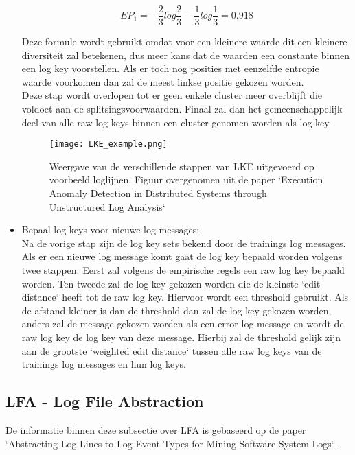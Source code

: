 \begin{itemize}
    \[EP_{1} = - \frac{2}{3}log\frac{2}{3} - \frac{1}{3}log\frac{1}{3} = 0.918\]
    
    Deze formule wordt gebruikt omdat voor een kleinere waarde dit een kleinere diversiteit zal betekenen, dus meer kans dat de waarden een constante binnen een log key voorstellen. Als er toch nog posities met eenzelfde entropie waarde voorkomen dan zal de meest linkse positie gekozen worden. \\
    
    Deze stap wordt overlopen tot er geen enkele cluster meer overblijft die voldoet aan de splitsingsvoorwaarden. Finaal zal dan het gemeenschappelijk deel van alle raw log keys binnen een cluster genomen worden als log key.\\
    
    \begin{center}
        \begin{figure}[!htp]
            \texttt{[image: LKE\_example.png]}
            \caption{Weergave van de verschillende stappen van LKE uitgevoerd op voorbeeld loglijnen. Figuur overgenomen uit de paper `Execution Anomaly Detection in Distributed Systems through Unstructured Log Analysis` \autocite{fu2009execution}}
            \label{pic:LKEstappen}
        \end{figure}
    \end{center}

    \item Bepaal log keys voor nieuwe log messages:\\
    Na de vorige stap zijn de log key sets bekend door de trainings log messages. Als er een nieuwe log message komt gaat de log key bepaald worden volgens twee stappen: Eerst zal volgens de empirische regels een raw log key bepaald worden. Ten tweede zal de log key gekozen worden die de kleinste `edit distance` heeft tot de raw log key. Hiervoor wordt een threshold gebruikt. Als de afstand kleiner is dan de threshold dan zal de log key gekozen worden, anders zal de message gekozen worden als een error log message en wordt de raw log key de log key van deze message. Hierbij zal de threshold gelijk zijn aan de grootste `weighted edit distance` tussen alle raw log keys van de trainings log messages en hun log keys.
\end{itemize}

\subsection{LFA - Log File Abstraction}
De informatie binnen deze subsectie over LFA is gebaseerd op de paper `Abstracting Log Lines to Log Event Types for Mining Software System Logs` \autocite{nagappan2010abstracting}.

